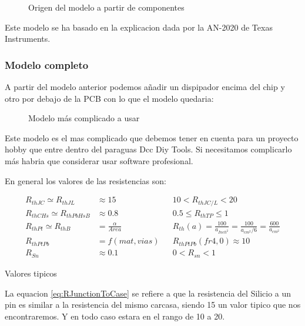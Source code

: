 \begin{figure}[H]
    \centering
    
    \caption{Origen del modelo a partir de componentes}
    \label{fig:ThermalModelOrigin}
\end{figure}

Este modelo se ha basado en la explicacion dada por la AN-2020\cite{TiAN2020} de Texas Instruments.


\subsubsection{Modelo completo}
A partir del modelo anterior podemos añadir un dispipador encima del chip y otro por debajo de la PCB con lo que el modelo quedaria:

\begin{figure}[H]
    \centering
    
    \caption{Modelo más complicado a usar}
    \label{fig:ThermalModelFull}
\end{figure}

Este modelo es el mas complicado que debemos tener en cuenta para un proyecto hobby que entre dentro
del paraguas Dcc Diy Tools. Si necesitamos complicarlo más habria que considerar usar software
profesional.

En general los valores de las resistencias son:

\begin{subequations}
    \label{eq:ResRthVal}
    \begin{align}
		\label{eq:RJunctionToCase}
			R_{thJC}	\simeq R_{thJL} & \approx 15 &&   10<R_{thJC/L} <20 \\
		\label{eq:RThermalPaste}
			R_{thCHs} \simeq R_{thPbHsB} &\approx 0.8 && 0.5\leq R_{thTP} \leq 1\\
		\label{eq:RPcb}
			R_{thPt}\simeq R_{thB}&=\frac{\alpha}{Area} && R_{th}(a)=\frac{100}{a_{Inch^2}} = \frac{100}{a_{cm^2}/6}=\frac{600}{a_{cm^2}}\\
   	\label{eq:ResTopBottom}
			R_{thPtPb}&=f(mat,vias) && R_{thPtPb}(fr4,0) \approx 10 \\
		\label{eq:ResSnValue}
			R_{Sn}& \approx 0.1 && 0< R_{sn} <1
	\end{align}
\end{subequations}
\begin{center}
Valores tipicos
\end{center}

La equacion \ref{eq:RJunctionToCase} se refiere a que la resistencia del Silicio a un pin es similar
a la resistencia del mismo carcasa, siendo 15 un valor tipico que nos encontraremos. 
Y en todo caso estara en el rango de 10 a 20.

